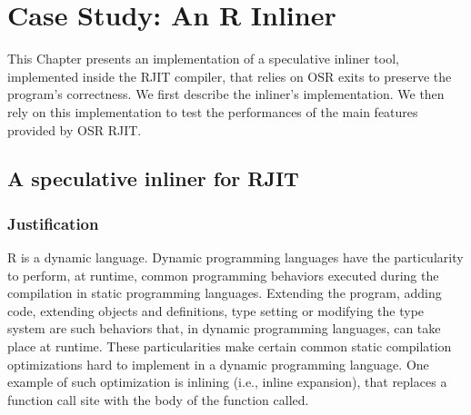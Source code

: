 
\chapter{Case Study: An R Inliner} %

\label{Chapter5} %


\newcommand{\keyword}[1]{\textbf{#1}}
\newcommand{\tabhead}[1]{\textbf{#1}}
\newcommand{\code}[1]{\texttt{#1}}
\newcommand{\file}[1]{\texttt{\bfseries#1}}
\newcommand{\option}[1]{\texttt{\itshape#1}}

This Chapter presents an implementation of a speculative inliner tool, implemented inside the RJIT compiler, that relies on OSR exits to preserve the program's correctness.
We first describe the inliner's implementation.
We then rely on this implementation to test the performances of the main features provided by OSR RJIT.\\

\section{A speculative inliner for RJIT}
\subsection{Justification}
R is a dynamic language. 
Dynamic programming languages have the particularity to perform, at runtime, common programming behaviors executed during the compilation in static programming languages.
Extending the program, adding code, extending objects and definitions, type setting or modifying the type system are such behaviors that, in dynamic programming languages, can take place at runtime.
These particularities make certain common static compilation optimizations hard to implement in a dynamic programming language.
One example of such optimization is inlining (i.e., inline expansion), that replaces a function call site with the body of the function called.\\

